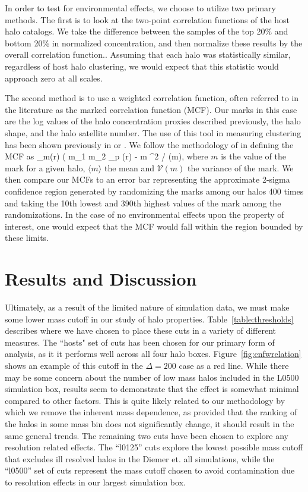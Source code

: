 \documentclass[usenatbib,usegraphicx,letterpaper]{mn2e}
\begin{document}
In order to test for environmental effects, we choose to utilize two primary methods. The first is to look at the two-point correlation functions of the host halo catalogs. We take the difference between the samples of the top 20\% and bottom 20\% in normalized concentration, and then normalize these results by the overall correlation function.. Assuming that each halo was statistically similar, regardless of host halo clustering, we would expect that this statistic would approach zero at all scales.

The second method is to use a weighted correlation function, often referred to in the literature as the marked correlation function (MCF). Our marks in this case are the log values of the halo concentration proxies described previously, the halo shape, and the halo satellite number. The use of this tool in measuring clustering has been shown previously in \citet{wechsler06} or \citet{harker06}. We follow the methodology of \citet{wechsler06} in defining the MCF as
\beq
{}_m(r) \equiv ( \langle m_1 m_2 \rangle_p (r) - \langle m \rangle^2 / (m),
\eeq
where $m$ is the value of the mark for a given halo, $\langle m \rangle$ the mean and $\mathcal{V}(m)$ the variance of the mark. We then compare our MCFs to an error bar representing the approximate 2-sigma confidence region generated by randomizing the marks among our halos 400 times and taking the 10th lowest and 390th highest values of the mark among the randomizations. In the case of no environmental effects upon the property of interest, one would expect that the MCF would fall within the region bounded by these limits.

\section[]{Results and Discussion}
\label{section:results}

Ultimately, as a result of the limited nature of simulation data, we must make some lower mass cutoff in our study of halo properties. Table~\ref{table:thresholds} describes where we have chosen to place these cuts in a variety of different measures. The ``hosts" set of cuts has been chosen for our primary form of analysis, as it it performs well across all four halo boxes. Figure~\ref{fig:cnfwrelation} shows an example of this cutoff in the $\Delta = 200$ case as a red line. While there may be some concern about the number of low mass halos included in the L0500 simulation box, results seem to demonstrate that the effect is somewhat minimal compared to other factors. This is quite likely related to our methodology by which we remove the inherent mass dependence, as provided that the ranking of the halos in some mass bin does not significantly change, it should result in the same general trends. The remaining two cuts have been chosen to explore any resolution related effects. The ``l0125'' cuts explore the lowest possible mass cutoff that excludes ill resolved halos in the Diemer et. all simulations, while the ``l0500'' set of cuts represent the mass cutoff chosen to avoid contamination due to resolution effects in our largest simulation box.
\end{document}
